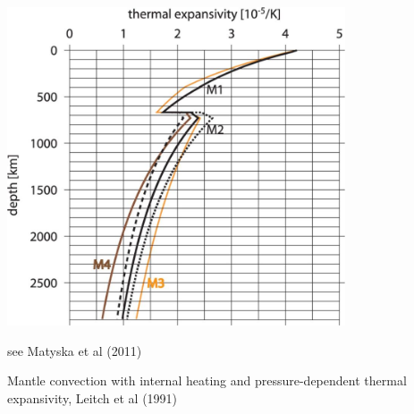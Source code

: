 

\includegraphics[width=10cm]{images/thermal_expansion/stca06.jpg}

see Matyska et al (2011) \cite{mayw11}

Mantle convection with internal heating and pressure-dependent thermal expansivity, Leitch et al (1991) \cite{leys91}
